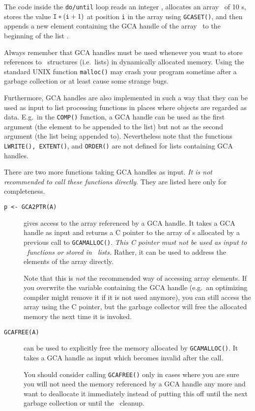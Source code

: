 The code inside the {\tt do/until} loop reads an integer \ttI, allocates an
array \ttA\ of 10 \Word s, stores the value ${{\tt I} * ({\tt i}+1)}$ at position
{\tt i} in the array using {\tt GCASET()}, and then appends a new element
containing the GCA handle of the array \ttA\ to the beginning of the list
\ttL.

Always remember that GCA handles must be used whenever you want to store
references to \saclib\ structures (i.e.\ lists) in dynamically allocated
memory. Using the standard UNIX function {\tt malloc()} may crash your program
sometime after a garbage collection or at least cause some strange bugs.

Furthermore, GCA handles are also implemented in such a way that they can
be used as input to list processing functions in places where objects are
regarded as data. E.g.\ in the {\tt COMP()} function, a GCA handle can be
used as the first argument (the element to be appended to the list) but not
as the second argument (the list being appended to). Nevertheless note that
the functions {\tt LWRITE(), EXTENT()}, and {\tt ORDER()} are not defined
for lists containing GCA handles.

There are two more functions taking GCA handles as input. {\em It is not
recommended to call these functions directly.} They are listed here only for
completeness.
\begin{description}
\item[{\tt p <- GCA2PTR(A)}]
  gives access to the array referenced by a GCA handle. It takes a GCA
  handle as input and returns a C pointer to the array of \Word s allocated
  by a previous call to {\tt GCAMALLOC()}. {\em This C pointer must not be
  used as input to \saclib\ functions or stored in \saclib\ lists.} Rather,
  it can be used to address the elements of the array directly.

  Note that this is {\em not} the recommended way of accessing array elements.
  If you overwrite the variable containing the GCA handle (e.g.\ an optimizing
  compiler might remove it if it is not used anymore), you can still access
  the array using the C pointer, but the garbage collector will free the
  allocated memory the next time it is invoked.

\item[{\tt GCAFREE(A)}]
  can be used to explicitly free the memory allocated by {\tt GCAMALLOC()}.
  It takes a GCA handle as input which becomes invalid after the call.

  You should consider calling {\tt GCAFREE()} only in cases where you are
  sure you will not need the memory referenced by a GCA handle any more and
  want to deallocate it immediately instead of putting this off until the
  next garbage collection or until the \saclib\ cleanup.

\end{description}


